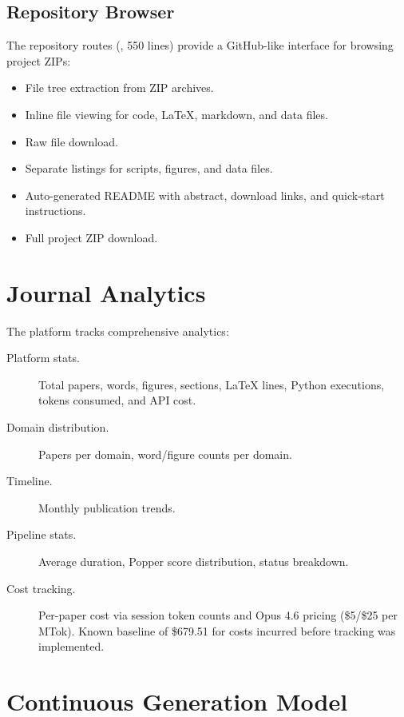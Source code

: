 \subsection{Repository Browser}

The repository routes (, 550 lines) provide a GitHub-like interface for browsing project ZIPs:

\begin{itemize}
  \item File tree extraction from ZIP archives.
  \item Inline file viewing for code, \LaTeX{}, markdown, and data files.
  \item Raw file download.
  \item Separate listings for scripts, figures, and data files.
  \item Auto-generated README with abstract, download links, and quick-start instructions.
  \item Full project ZIP download.
\end{itemize}

\section{Journal Analytics}
\label{sec:journal:analytics}

The platform tracks comprehensive analytics:

\begin{description}
  \item[Platform stats.] Total papers, words, figures, sections, \LaTeX{} lines, Python executions, tokens consumed, and API cost.
  \item[Domain distribution.] Papers per domain, word/figure counts per domain.
  \item[Timeline.] Monthly publication trends.
  \item[Pipeline stats.] Average duration, Popper score distribution, status breakdown.
  \item[Cost tracking.] Per-paper cost via session token counts and Opus 4.6 pricing (\$5/\$25 per MTok). Known baseline of \$679.51 for costs incurred before tracking was implemented.
\end{description}

\section{Continuous Generation Model}
\label{sec:journal:continuous}

